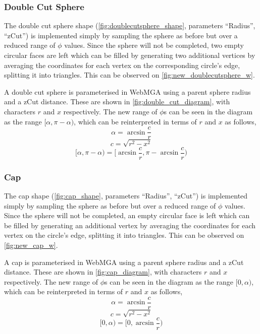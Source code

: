 
\subsubsection{Double Cut Sphere}
The double cut sphere shape (\cref{fig:doublecutsphere_shape}, parameters ``Radius'', ``zCut'') is implemented simply by sampling the sphere as before but over a reduced range of $\phi$ values. Since the sphere will not be completed, two empty circular faces are left which can be filled by generating two additional vertices by averaging the coordinates for each vertex on the corresponding circle's edge, splitting it into triangles. This can be observed on \cref{fig:new_doublecutsphere_w}.

A double cut sphere is parameterised in WebMGA using a parent sphere radius and a zCut distance. These are shown in \cref{fig:double_cut_diagram}, with characters $r$ and $x$ respectively. The new range of $\phi$s can be seen in the diagram as the range $[\alpha,\pi-\alpha)$, which can be reinterpreted in terms of $r$ and $x$ as follows,
\begin{equation}
\alpha=\arcsin\frac{c}{r}
\end{equation}
\begin{equation}
c=\sqrt{r^2-x^2}
\end{equation}
\begin{equation}
[\alpha,\pi-\alpha)=[\arcsin\frac{c}{r},\pi - \arcsin\frac{c}{r})
\end{equation}

\subsubsection{Cap}
\label{cap_section}
The cap shape (\cref{fig:cap_shape}, parameters ``Radius'', ``zCut'') is implemented simply by sampling the sphere as before but over a reduced range of $\phi$ values. Since the sphere will not be completed, an empty circular face is left which can be filled by generating an additional vertex by averaging the coordinates for each vertex on the circle's edge, splitting it into triangles. This can be observed on \cref{fig:new_cap_w}.

A cap is parameterised in WebMGA using a parent sphere radius and a zCut distance. These are shown in \cref{fig:cap_diagram}, with characters $r$ and $x$ respectively. The new range of $\phi$s can be seen in the diagram as the range $[0,\alpha)$, which can be reinterpreted in terms of $r$ and $x$ as follows,
\begin{equation}
\alpha=\arcsin\frac{c}{r}
\end{equation}
\begin{equation}
c=\sqrt{r^2-x^2}
\end{equation}
\begin{equation}
[0, \alpha)=[0, \arcsin\frac{c}{r})
\end{equation}

